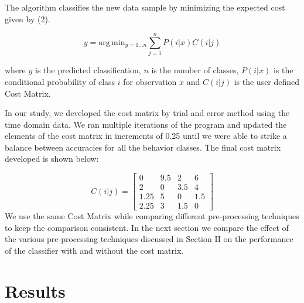 \documentclass[conference]{IEEEtran}
\begin{document}
The algorithm classifies the new data sample by minimizing the expected cost given by (2).

\begin{equation}
	y = \mathrm{arg} \, \mathrm{min}_{y = 1 \ldots n} \sum^n_{j=1} P(i|x) C(i|j)
\end{equation}

where $y$ is the predicted classification, $n$ is the number of classes, $P(i|x)$ is the conditional probability of class $i$ for observation $x$ and $C(i|j)$ is the user defined Cost Matrix.

In our study, we developed the cost matrix by trial and error method using the time domain data. We ran multiple iterations of the program and updated the elements of the cost matrix in increments of 0.25 until we were able to strike a balance between accuracies for all the behavior classes. The final cost matrix developed is shown below:

$$
C(i|j) = \begin{bmatrix}
	0 & 9.5 & 2 & 6 \\
	2 & 0 & 3.5 & 4 \\
	1.25 & 5 & 0 & 1.5 \\
	2.25 & 3 & 1.5 & 0
\end{bmatrix}
$$
 We use the same Cost Matrix while comparing different pre-processing techniques to keep the comparison consistent. In the next section we compare the effect of the various pre-processing techniques discussed in Section II on the performance of the classifier with and without the cost matrix.
 
\section{Results}

\end{document}
